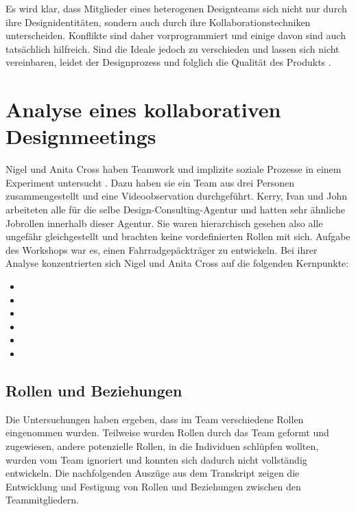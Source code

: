 \medskip Es wird klar, dass Mitglieder eines heterogenen Designteams sich nicht nur durch ihre Designidentitäten, sondern auch durch ihre Kollaborationstechniken unterscheiden. Konflikte sind daher vorprogrammiert und einige davon sind auch tatsächlich hilfreich. Sind die Ideale jedoch zu verschieden und lassen sich nicht vereinbaren, leidet der Designprozess und folglich die Qualität des Produkts \citep{Kilker:1999}. 

\section{Analyse eines kollaborativen Designmeetings} 

Nigel und Anita Cross haben Teamwork und implizite soziale Prozesse in einem Experiment untersucht \citep{Cross:1995}. Dazu haben sie ein Team aus drei Personen zusammengestellt und eine Videoobservation durchgeführt. Kerry, Ivan und John arbeiteten alle für die selbe Design-Consulting-Agentur und hatten sehr ähnliche Jobrollen innerhalb dieser Agentur. Sie waren hierarchisch gesehen also alle ungefähr gleichgestellt und brachten keine vordefinierten Rollen mit sich. Aufgabe des Workshops war es, einen Fahrradgepäckträger zu entwickeln. Bei ihrer Analyse konzentrierten sich Nigel und Anita Cross auf die folgenden Kernpunkte:

\begin{itemize}
	\item {}
	\item {}
	\item {}
	\item {}
	\item {}
	\item {}
\end{itemize}

\subsection{Rollen und Beziehungen}\label{sec:collabRoles} 

Die Untersuchungen haben ergeben, dass im Team verschiedene Rollen eingenommen wurden. Teilweise wurden Rollen durch das Team geformt und zugewiesen, andere potenzielle Rollen, in die Individuen schlüpfen wollten, wurden vom Team ignoriert und konnten sich dadurch nicht vollständig entwickeln. Die nachfolgenden Auszüge aus dem Transkript zeigen die Entwicklung und Festigung von Rollen und Beziehungen zwischen den Teammitgliedern.

